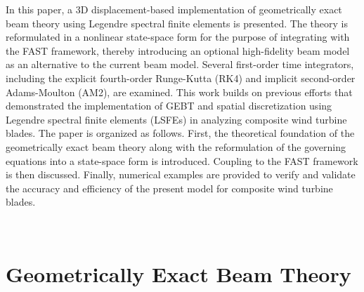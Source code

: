 \documentclass{aiaa-tc}
\begin{document}
In this paper, a 3D displacement-based
implementation of geometrically exact beam theory using Legendre
spectral finite elements is presented. The theory is reformulated in a
nonlinear state-space form for the purpose of integrating with the FAST
framework, thereby introducing an optional high-fidelity beam model as an
alternative to the current beam model. Several first-order time integrators, including the explicit fourth-order Runge-Kutta (RK4) and implicit second-order Adams-Moulton (AM2), are examined. This work builds on previous efforts
that demonstrated the implementation of GEBT and spatial discretization using Legendre spectral finite elements
(LSFEs)\cite{Wang:GEBT2013,Wang:SFE2013,Wang:GEBT2014,Sprague:FAST2014} in analyzing composite wind turbine blades. The paper is organized as
follows.  First, the theoretical foundation of the geometrically exact beam
theory along with the reformulation of the governing equations into a
state-space form is introduced. Coupling to the FAST framework is then
discussed. Finally, numerical examples are
provided to verify and validate the accuracy and efficiency of the present model for
composite wind turbine blades. 

~

\section{Geometrically Exact Beam Theory}
\end{document}
